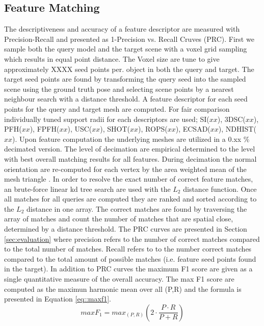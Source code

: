 \documentclass[10pt,twocolumn,letterpaper]{article}
\begin{document}
\subsection{Feature Matching}
The descriptiveness and accuracy of a feature descriptor are measured with Precision-Recall and presented as 1-Precision vs. Recall Cruves (PRC). First we sample both the query model and the target scene with a voxel grid sampling \cite{RusuCousins2011} which results in equal point distance. The Voxel size are tune to give approximately XXXX seed points per. object in both the query and target. The target seed points are found by transforming the query seed into the sampled scene using the ground truth pose and selecting scene points by a nearest neighbour search with a distance threshold. A feature descriptor for each seed points for the query and target mesh are computed.  For fair comparison individually tuned support radii for each descriptors are used; SI($xx$), 3DSC($xx$), PFH($xx$), FPFH($xx$), USC($xx$), SHOT($xx$), ROPS($xx$), ECSAD($xx$), NDHIST($xx$). Upon feature computation the underlying meshes are utilized in a 0.xx \% decimated version. The level of decimation are empirical determined to the level with best overall matching results for all features. During decimation the normal orientation are re-computed for each vertex by the area weighted mean of the mesh triangle \cite{Thurmer1998}. In order to resolve the exact number of correct feature matches, an brute-force linear kd tree search are used with the ${L_2}$ distance function. Once all matches for all queries are computed they are ranked and sorted according to the ${L_2}$ distance in one array. The correct matches are found by traversing the array of matches and count the number of matches that are spatial close, determined by a distance threshold. The PRC curves are presented in Section \ref{sec:evaluation} where precision refers to the number of correct matches compared to the total number of matches. Recall refers to to the number correct matches compared to the total amount of possible matches (i.e. feature seed points found in the target). In addition to PRC curves the maximum F1 score are given as a single quantitative measure of the overall accuracy. The max F1 score are computed as the maximun harmonic mean over all (P,R) and the formula is presented in Equation \ref{eq::maxf1}.
\begin{equation}\label{eq::maxf1}
max F_1 = {max}_{(P,R)} \left(2 \cdot \frac{P\cdot R}{P+R}\right)
\end{equation}
\end{document}
